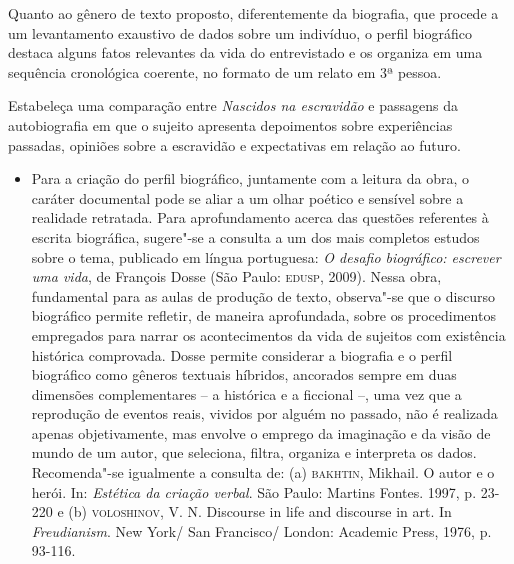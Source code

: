 \documentclass[11pt]{extarticle}
\begin{document}
Quanto ao gênero de texto proposto, diferentemente da biografia, que
procede a um levantamento exaustivo de dados sobre um indivíduo, o
perfil biográfico destaca alguns fatos relevantes da vida do
entrevistado e os organiza em uma sequência cronológica coerente, no
formato de um relato em 3ª pessoa.

Estabeleça uma comparação entre \emph{Nascidos na escravidão} e
passagens da autobiografia em que o sujeito apresenta depoimentos sobre
experiências passadas, opiniões sobre a escravidão e expectativas em
relação ao futuro.

\begin{itemize}
\item
  Para a criação do perfil biográfico, juntamente com a leitura da obra,
  o caráter documental pode se aliar a um olhar poético e sensível sobre
  a realidade retratada. Para aprofundamento acerca das questões
  referentes à escrita biográfica, sugere"-se a consulta a um dos mais
  completos estudos sobre o tema, publicado em língua portuguesa:
  \emph{O desafio biográfico: escrever uma vida}, de François Dosse (São
  Paulo: \textsc{edusp}, 2009). Nessa obra, fundamental para as aulas de produção
  de texto, observa"-se que o discurso biográfico permite refletir, de
  maneira aprofundada, sobre os procedimentos empregados para narrar os
  acontecimentos da vida de sujeitos com existência histórica
  comprovada. Dosse permite considerar a biografia e o perfil biográfico
  como gêneros textuais híbridos, ancorados sempre em duas dimensões
  complementares -- a histórica e a ficcional --, uma vez que a
  reprodução de eventos reais, vividos por alguém no passado, não é
  realizada apenas objetivamente, mas envolve o emprego da imaginação e
  da visão de mundo de um autor, que seleciona, filtra, organiza e
  interpreta os dados. Recomenda"-se igualmente a consulta de: (a)
  \textsc{bakhtin}, Mikhail. O autor e o herói. In: \emph{Estética da criação
  verbal}. São Paulo: Martins Fontes. 1997, p. 23-220 e (b) \textsc{voloshinov},
  V. N. Discourse in life and discourse in art. In \emph{Freudianism}.
  New York/ San Francisco/ London: Academic Press, 1976, p. 93-116.
\end{itemize}
\end{document}
